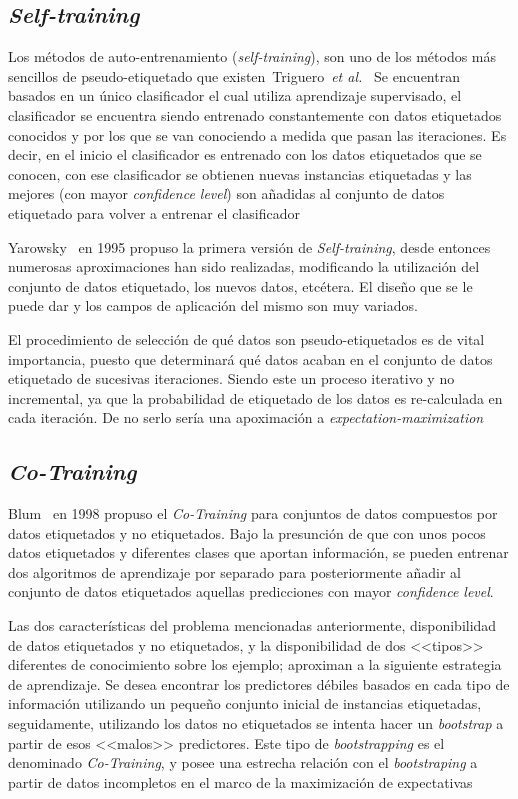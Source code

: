 \subsection{\textit{Self-training}}
Los métodos de auto-entrenamiento (\textit{self-training}), son uno de los métodos más sencillos de pseudo-etiquetado que existen~Triguero~\textit{et al.}~\cite{triguero2015self} Se encuentran basados en un único clasificador el cual utiliza aprendizaje supervisado, el clasificador se encuentra siendo entrenado constantemente con datos etiquetados conocidos y por los que se van conociendo a medida que pasan las iteraciones. Es decir, en el inicio el clasificador es entrenado con los datos etiquetados que se conocen, con ese clasificador se obtienen nuevas instancias etiquetadas y las mejores (con mayor \textit{confidence level}) son añadidas al conjunto de datos etiquetado para volver a entrenar el clasificador~\cite{jesper2020survey}

Yarowsky~\cite{yarowsky1995unsupervised} en 1995 propuso la primera versión de \textit{Self-training}, desde entonces numerosas aproximaciones han sido realizadas, modificando la utilización del conjunto de datos etiquetado, los nuevos datos, etcétera. El diseño que se le puede dar y los campos de aplicación del mismo son muy variados.

El procedimiento de selección de qué datos son pseudo-etiquetados es de vital importancia, puesto que determinará qué datos acaban en el conjunto de datos etiquetado de sucesivas iteraciones. Siendo este un proceso iterativo y no incremental, ya que la probabilidad de etiquetado de los datos es re-calculada en cada iteración. De no serlo sería una apoximación a \textit{expectation-maximization}~\cite{dempster1977maximum}



\subsection{\textit{Co-Training}}
Blum~\cite{blum1998combining} en 1998 propuso el \textit{Co-Training} para conjuntos de datos compuestos por datos etiquetados y no etiquetados. Bajo la presunción de que con unos pocos datos etiquetados y diferentes clases que aportan información, se pueden entrenar dos algoritmos de aprendizaje por separado para posteriormente añadir al conjunto de datos etiquetados aquellas predicciones con mayor \textit{confidence level}.

Las dos características del problema mencionadas anteriormente, disponibilidad de datos etiquetados y no etiquetados, y la disponibilidad de dos <<tipos>> diferentes de conocimiento sobre los ejemplo; aproximan a la siguiente estrategia de aprendizaje. Se desea encontrar los predictores débiles basados en cada tipo de información utilizando un pequeño conjunto inicial de instancias etiquetadas, seguidamente, utilizando los datos no etiquetados se intenta hacer un \textit{bootstrap} a partir de esos <<malos>> predictores. Este tipo de \textit{bootstrapping} es el denominado \textit{Co-Training}, y posee una estrecha relación con el \textit{bootstraping} a partir de datos incompletos en el marco de la maximización de expectativas~\cite{ghahramani1994supervised, ratsaby1995learning}

